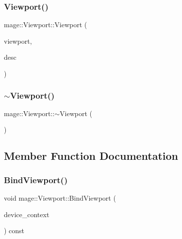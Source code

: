\hypertarget{classmage_1_1_viewport_a61d8b17ff42b3d78d3b5e9eebff13496}{}\label{classmage_1_1_viewport_a61d8b17ff42b3d78d3b5e9eebff13496} 
\subsubsection{\texorpdfstring{Viewport()}{Viewport()}\hspace{0.1cm}{\footnotesize\ttfamily [11/11]}}
{\footnotesize\ttfamily mage\+::\+Viewport\+::\+Viewport (\begin{DoxyParamCaption}\item[{\hyperlink{classmage_1_1_viewport}{Viewport} \&\&}]{viewport,  }\item[{\hyperlink{namespacemage_a86cd40b8f2f42ca4d616cc6ec665a7f2}{A\+A\+Descriptor}}]{desc }\end{DoxyParamCaption})\hspace{0.3cm}{\ttfamily [explicit]}}

\hypertarget{classmage_1_1_viewport_a6fcf68e154b186d5c6241c495cc93fe5}{}\label{classmage_1_1_viewport_a6fcf68e154b186d5c6241c495cc93fe5} 
\subsubsection{\texorpdfstring{$\sim$\+Viewport()}{~Viewport()}}
{\footnotesize\ttfamily mage\+::\+Viewport\+::$\sim$\+Viewport (\begin{DoxyParamCaption}{ }\end{DoxyParamCaption})\hspace{0.3cm}{\ttfamily [default]}}



\subsection{Member Function Documentation}
\hypertarget{classmage_1_1_viewport_a363d750cdb8c21ee5b3e68a323f914db}{}\label{classmage_1_1_viewport_a363d750cdb8c21ee5b3e68a323f914db} 
\subsubsection{\texorpdfstring{Bind\+Viewport()}{BindViewport()}}
{\footnotesize\ttfamily void mage\+::\+Viewport\+::\+Bind\+Viewport (\begin{DoxyParamCaption}\item[{I\+D3\+D11\+Device\+Context4 $\ast$}]{device\+\_\+context }\end{DoxyParamCaption}) const\hspace{0.3cm}{\ttfamily [noexcept]}}

